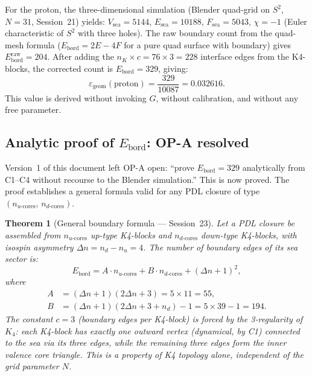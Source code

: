 \documentclass[12pt,a4paper]{article}
\theoremstyle{plain}
\newtheorem{theorem}{Theorem}[section]
\theoremstyle{definition}
\theoremstyle{remark}
\newcommand{\Kfour}{K_4}
\newcommand{\Deltanop}{\Delta n}
\newcommand{\egeom}{\varepsilon_{\mathrm{geom}}}
\newcommand{\nK}{n_K}
\begin{document}
For the proton, the three-dimensional simulation (Blender quad-grid on $S^2$, $N=31$, Session~21) yields: $V_{\mathrm{sea}}=5144$, $E_{\mathrm{sea}}=10188$, $F_{\mathrm{sea}}=5043$, $\chi=-1$ (Euler characteristic of $S^2$ with three holes). The raw boundary count from the quad-mesh formula ($E_{\mathrm{bord}}=2E-4F$ for a pure quad surface with boundary) gives $E_{\mathrm{bord}}^{\mathrm{raw}}=204$. After adding the $\nK\times c = 76\times 3 = 228$ interface edges from the K4-blocks, the corrected count is $E_{\mathrm{bord}}=329$, giving:
\[
\egeom(\mathrm{proton}) = \frac{329}{10087} = 0.032616.
\]
This value is derived without invoking $G$, without calibration, and without any free parameter.

\subsection{Analytic proof of \texorpdfstring{$E_{\mathrm{bord}}$}{E\_bord}: OP-A resolved}
\label{subsec:opa}

Version~1 of this document left OP-A open: ``prove $E_{\mathrm{bord}}=329$ analytically from C1--C4 without recourse to the Blender simulation.'' This is now proved. The proof establishes a general formula valid for any PDL closure of type $(n_{u\text{-cores}},\,n_{d\text{-cores}})$.

\begin{theorem}[General boundary formula --- Session~23]
\label{thm:ebord_general}
Let a PDL closure be assembled from $n_{u\text{-cores}}$ up-type K4-blocks and $n_{d\text{-cores}}$ down-type K4-blocks, with isospin asymmetry $\Deltanop = n_d - n_u = 4$. The number of boundary edges of its sea sector is:
\[
E_{\mathrm{bord}} = A\cdot n_{u\text{-cores}} + B\cdot n_{d\text{-cores}} + (\Deltanop+1)^2,
\]
where
\begin{align*}
A &= (\Deltanop+1)(2\Deltanop+3) = 5\times 11 = 55,\\
B &= (\Deltanop+1)(2\Deltanop+3+n_d) - 1 = 5\times 39 - 1 = 194.
\end{align*}
The constant $c=3$ (boundary edges per K4-block) is forced by the 3-regularity of $\Kfour$: each K4-block has exactly one outward vertex (dynamical, by C1) connected to the sea via its three edges, while the remaining three edges form the inner valence core triangle. This is a property of K4 topology alone, independent of the grid parameter $N$.
\end{theorem}
\end{document}
